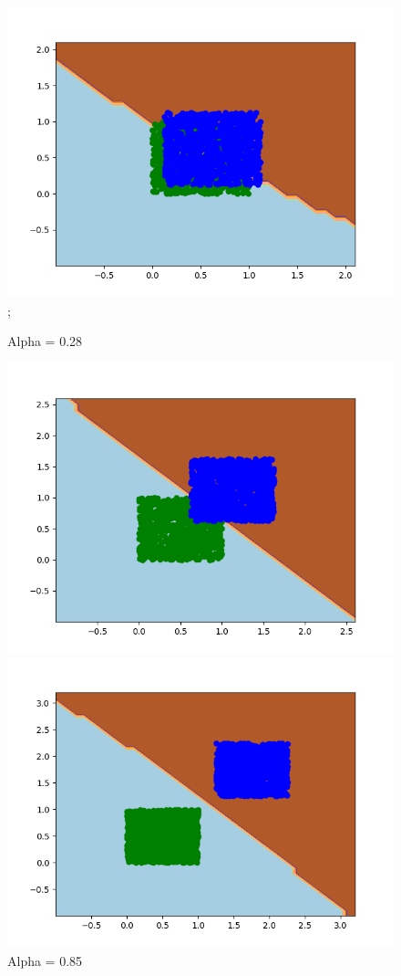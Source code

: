 \documentclass{article}
\begin{document}
\begin{figure}[!htb]
\begin{minipage}{0.24\textwidth}
		\includegraphics[scale=0.24]{../equalpriors/this17.png};
	\caption{Alpha = 0.28}
	\end{minipage}
	\begin{minipage}{0.24\textwidth}
			\centering
			\includegraphics[scale=0.24]{../equalpriors/this21.png}
			\caption{Alpha = 0.85}
	\end{minipage}
	\begin{minipage}{0.24\textwidth}
		\centering
		\includegraphics[width=1\linewidth]{../equalpriors/this26.png}

\end{minipage}
\end{figure}
\end{document}
